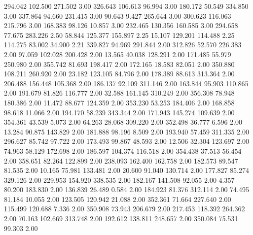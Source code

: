  294.042  102.500  271.502         3.00
 326.643  106.613   96.994         3.00
 180.172   50.549  334.850         3.00
 337.864   94.660  231.415         3.00
  90.643    9.427  265.644         3.00
 300.623  116.063  215.796         3.00
 168.383   98.126   10.857         3.00
 232.465  130.356  160.585         3.00
 294.658   77.675  283.226         2.50
  58.844  125.377  155.897         2.25
  15.107  129.201  114.488         2.25
 114.275   83.002   34.900         2.21
 339.827   94.969  291.844         2.00
 312.826   52.570  226.383         2.00
  97.059  102.028  200.428         2.00
  13.565   40.038  128.291         2.00
 171.485   55.979  250.980         2.00
 355.742   81.693  198.417         2.00
 172.165   18.583   82.051         2.00
 350.880  108.211  260.920         2.00
  23.182  123.105   84.796         2.00
 178.389   88.613  313.364         2.00
 206.488  156.448  105.368         2.00
 186.137   92.109  311.146         2.00
 163.844   95.903  110.865         2.00
 191.679   81.826  116.777         2.00
  32.588  161.145  310.249         2.00
 356.308   78.948  180.386         2.00
  11.472   88.677  124.359         2.00
 353.230   53.253  184.406         2.00
 168.858   98.618   11.066         2.00
 194.170   58.239  343.344         2.00
 171.943  145.274  109.639         2.00
 354.361   43.539    5.073         2.00
  64.263   28.068  309.220         2.00
 352.498   36.777    6.596         2.00
  13.284   90.875  143.829         2.00
 181.888   98.196    8.509         2.00
 193.940   57.459  311.335         2.00
 296.627   85.742   97.722         2.00
 173.493   99.867   48.593         2.00
  12.506   32.304  123.697         2.00
  74.963   58.129  172.698         2.00
 186.597  104.374  116.518         2.00
 354.438   37.513   56.454         2.00
 358.651   82.264  122.899         2.00
 238.093  162.400  162.758         2.00
 182.573   89.547   81.535         2.00
  10.165   75.981  133.481         2.00
  20.600   91.040  130.714         2.00
 177.827   85.274  329.126         2.00
 229.953  154.920  338.535         2.00
 182.167  141.508   92.055         2.00
   4.357   80.200  183.830         2.00
 136.839   26.489    0.584         2.00
 184.923   81.376  312.114         2.00
  74.495   81.184   10.055         2.00
 123.505  120.942   21.088         2.00
 352.361   71.664  227.640         2.00
 115.499  120.688    7.336         2.00
 350.908   73.943  206.679         2.00
 217.453  118.392  264.362         2.00
  70.163  102.669  313.748         2.00
 192.612  138.811  248.657         2.00
 350.084   75.531   99.303         2.00
